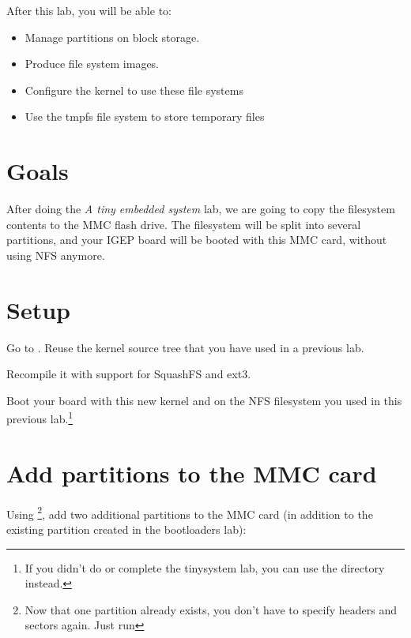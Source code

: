 
After this lab, you will be able to:
\begin{itemize}
\item Manage partitions on block storage.
\item Produce file system images.
\item Configure the kernel to use these file systems
\item Use the tmpfs file system to store temporary files
\end{itemize}

\section{Goals}

After doing the {\em A tiny embedded system} lab, we are going to copy
the filesystem contents to the MMC flash drive. The filesystem will be
split into several partitions, and your IGEP board will be booted with
this MMC card, without using NFS anymore.

\section{Setup}

Go to . Reuse the kernel source tree that
you have used in a previous lab.

Recompile it with support for SquashFS and ext3.

Boot your board with this new kernel and on the NFS filesystem you
used in this previous lab.\footnote{If you didn't do or complete the
  tinysystem lab, you can use the  directory instead.}

\section{Add partitions to the MMC card}

Using 
\footnote{Now that one partition already exists, you don't have to specify
headers and sectors again. Just run },
add two additional partitions to the MMC card (in
addition to the existing  partition created in the
bootloaders lab):

